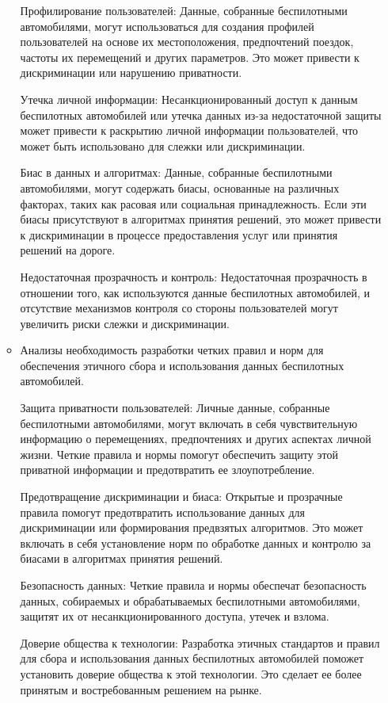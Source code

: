 \documentclass{article}
\begin{document}
\begin{itemize}
\begin{itemize}
        Профилирование пользователей: Данные, собранные беспилотными автомобилями, могут использоваться для создания профилей пользователей на основе их местоположения, предпочтений поездок, частоты их перемещений и других параметров. Это может привести к дискриминации или нарушению приватности.

        Утечка личной информации: Несанкционированный доступ к данным беспилотных автомобилей или утечка данных из-за недостаточной защиты может привести к раскрытию личной информации пользователей, что может быть использовано для слежки или дискриминации.

        Биас в данных и алгоритмах: Данные, собранные беспилотными автомобилями, могут содержать биасы, основанные на различных факторах, таких как расовая или социальная принадлежность. Если эти биасы присутствуют в алгоритмах принятия решений, это может привести к дискриминации в процессе предоставления услуг или принятия решений на дороге.

        Недостаточная прозрачность и контроль: Недостаточная прозрачность в отношении того, как используются данные беспилотных автомобилей, и отсутствие механизмов контроля со стороны пользователей могут увеличить риски слежки и дискриминации.

        \item Анализы необходимость разработки четких правил и норм для обеспечения этичного сбора и использования данных беспилотных автомобилей.

        Защита приватности пользователей: Личные данные, собранные беспилотными автомобилями, могут включать в себя чувствительную информацию о перемещениях, предпочтениях и других аспектах личной жизни. Четкие правила и нормы помогут обеспечить защиту этой приватной информации и предотвратить ее злоупотребление.

        Предотвращение дискриминации и биаса: Открытые и прозрачные правила помогут предотвратить использование данных для дискриминации или формирования предвзятых алгоритмов. Это может включать в себя установление норм по обработке данных и контролю за биасами в алгоритмах принятия решений.

        Безопасность данных: Четкие правила и нормы обеспечат безопасность данных, собираемых и обрабатываемых беспилотными автомобилями, защитят их от несанкционированного доступа, утечек и взлома.

        Доверие общества к технологии: Разработка этичных стандартов и правил для сбора и использования данных беспилотных автомобилей поможет установить доверие общества к этой технологии. Это сделает ее более принятым и востребованным решением на рынке.


\end{itemize}
\end{itemize}
\end{document}
